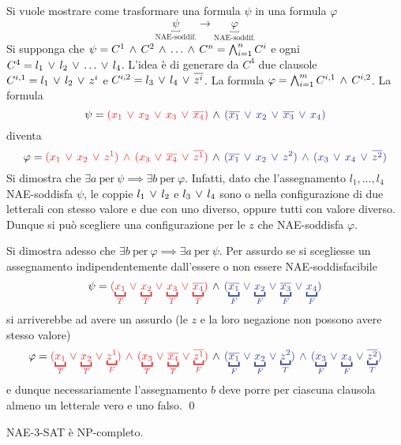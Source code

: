 \begin{demonstration}
	Si vuole mostrare come trasformare una formula $\psi$ in una formula $\varphi$
	\begin{equation*}
		\underbracket{\psi}_{\text{NAE-soddif.}} \longrightarrow \underbracket{\varphi}_{\text{NAE-soddif.}}
	\end{equation*}
	Si supponga che $\psi=C^1\,\wedge\, C^2\,\wedge\,\dots\,\wedge\, C^n=\bigwedge_{i=1}^nC^i$ e ogni $C^4=l_1\,\vee\, l_2\,\vee\,\dots\,\vee\, l_4$. L'idea è di generare da $C^4$ due clausole $C^{i,1}=l_1\,\vee\, l_2\,\vee\, z^i$ e $C^{i,2}=l_3\,\vee\, l_4\,\vee\, \overline{z^i}$. La formula $\varphi=\bigwedge_{i=1}^m C^{i,1}\,\wedge\, C^{i,2}$. La formula \[\psi={\color{Red}(x_1\ve x_2\ve x_3\ve \overline{x_4})}\ive{\color{Blue}(\overline{x_1}\ve x_2\ve \overline{x_3}\ve x_4)}\] diventa \[\varphi={\color{Red}(x_1\ve x_2\ve z^1)\ive (x_3\ve \overline{x_4}\ve\overline{z^1})}\ive{\color{Blue}(\overline{x_1}\ve x_2\ve z^2)\ive(x_3\ve x_4\ve \overline{z^2})}\] Si dimostra che $\exists a\ \text{per}\ \psi\implies\exists b\ \text{per}\ \varphi$. Infatti, dato che l'assegnamento $l_1,\dots,l_4$ NAE-soddisfa $\psi$, le coppie $l_1\,\vee\, l_2$ e $l_3\,\vee\, l_4$ sono o nella configurazione di due letterali con stesso valore e due con uno diverso, oppure tutti con valore diverso. Dunque si può scegliere una configurazione per le $z$ che NAE-soddisfa $\varphi$.
	
	Si dimostra adesso che $\exists b\ \text{per}\ \varphi \implies\exists a\ \text{per}\ \psi$. Per assurdo se si scegliesse un assegnamento indipendentemente dall'essere o non essere NAE-soddisfacibile
		\[\psi={\color{Red}(\utrue{x_1}\ve \utrue{x_2}\ve \utrue{x_3}\ve \utrue{\overline{x_4}})}\ive{\color{Blue}(\ufalse{\overline{x_1}}\ve \ufalse{x_2}\ve \ufalse{\overline{x_3}}\ve \ufalse{x_4})}\]
	si arriverebbe ad avere un assurdo (le $z$ e la loro negazione non possono avere stesso valore)
	\[\varphi={\color{Red}(\utrue{x_1}\ve \utrue{x_2}\ve \ufalse{z^1})\ive (\utrue{x_3}\ve \utrue{\overline{x_4}}\ve\ufalse{\overline{z^1}})}\ive{\color{Blue}(\ufalse{\overline{x_1}}\ve \ufalse{x_2}\ve \utrue{z^2})\ive(\ufalse{x_3}\ve \ufalse{x_4}\ve \utrue{\overline{z^2}})}\]
	e dunque necessariamente l'assegnamento $b$ deve porre per ciascuna clausola almeno un letterale vero e uno falso.
	\qed
\end{demonstration}
NAE-3-SAT è NP-completo.

